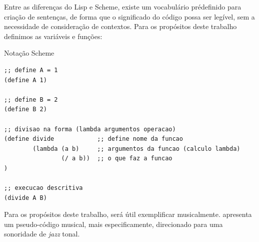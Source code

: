 Entre as diferenças do Lisp e Scheme, existe um vocabulário prédefinido para criação de sentenças, de forma que o significado do código possa ser legível, sem a necessidade de consideração de contextos. Para os propósitos deste trabalho definimos as variáveis e funções:

\begin{example}{Notação Scheme}
\begin{verbatim}
;; define A = 1
(define A 1)

;; define B = 2
(define B 2)

;; divisao na forma (lambda argumentos operacao) 
(define divide            ;; define nome da funcao
        (lambda (a b)     ;; argumentos da funcao (calculo lambda)
                (/ a b))  ;; o que faz a funcao
)

;; execucao descritiva
(divide A B)
\end{verbatim}
\end{example}

Para os propósitos deste trabalho, será útil exemplificar musicalmente.  apresenta um pseudo-código musical, mais especificamente, direcionado para uma sonoridade de \emph{jazz} tonal. 


